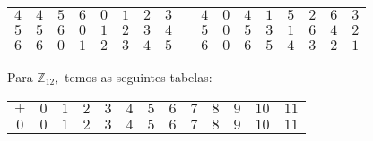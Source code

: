 \documentclass[12pt, a4paper]{article}
\begin{document}
\begin{solution}
\begin{center}
\begin{table}[h]
\begin{tabular}{ccccccccccccccccc}
\multicolumn{1}{c|}{$4$} & \multicolumn{1}{c|}{$4$} & \multicolumn{1}{c|}{$5$} & \multicolumn{1}{c|}{$6$} & \multicolumn{1}{c|}{$0$} & \multicolumn{1}{c|}{$1$} & \multicolumn{1}{c|}{$2$} & \multicolumn{1}{c|}{$3$} &  & \multicolumn{1}{c|}{$4$} & \multicolumn{1}{c|}{$0$} & \multicolumn{1}{c|}{$4$} & \multicolumn{1}{c|}{$1$} & \multicolumn{1}{c|}{$5$} & \multicolumn{1}{c|}{$2$} & \multicolumn{1}{c|}{$6$} & \multicolumn{1}{c|}{$3$} \\ \cline{2-8} \cline{11-17} 
\multicolumn{1}{c|}{$5$} & \multicolumn{1}{c|}{$5$} & \multicolumn{1}{c|}{$6$} & \multicolumn{1}{c|}{$0$} & \multicolumn{1}{c|}{$1$} & \multicolumn{1}{c|}{$2$} & \multicolumn{1}{c|}{$3$} & \multicolumn{1}{c|}{$4$} &  & \multicolumn{1}{c|}{$5$} & \multicolumn{1}{c|}{$0$} & \multicolumn{1}{c|}{$5$} & \multicolumn{1}{c|}{$3$} & \multicolumn{1}{c|}{$1$} & \multicolumn{1}{c|}{$6$} & \multicolumn{1}{c|}{$4$} & \multicolumn{1}{c|}{$2$} \\ \cline{2-8} \cline{11-17} 
\multicolumn{1}{c|}{$6$} & \multicolumn{1}{c|}{$6$} & \multicolumn{1}{c|}{$0$} & \multicolumn{1}{c|}{$1$} & \multicolumn{1}{c|}{$2$} & \multicolumn{1}{c|}{$3$} & \multicolumn{1}{c|}{$4$} & \multicolumn{1}{c|}{$5$} &  & \multicolumn{1}{c|}{$6$} & \multicolumn{1}{c|}{$0$} & \multicolumn{1}{c|}{$6$} & \multicolumn{1}{c|}{$5$} & \multicolumn{1}{c|}{$4$} & \multicolumn{1}{c|}{$3$} & \multicolumn{1}{c|}{$2$} & \multicolumn{1}{c|}{$1$} \\ \cline{2-8} \cline{11-17} 
\end{tabular}
\end{table}
\end{center}
Para $\mathbb{Z}_{12},$ temos as seguintes tabelas:
\begin{center}
    \begin{table}[h]
\begin{tabular}{ccccccccccccc}
\textbf{$+$}              & $0$                       & $1$                       & $2$                       & $3$                       & $4$                       & $5$                       & $6$                       & \multicolumn{1}{l}{$7$}   & \multicolumn{1}{l}{$8$}   & \multicolumn{1}{l}{$9$}   & \multicolumn{1}{l}{$10$}  & \multicolumn{1}{l}{$11$}  \\ \cline{2-13} 
\multicolumn{1}{c|}{$0$}  & \multicolumn{1}{c|}{$0$}  & \multicolumn{1}{c|}{$1$}  & \multicolumn{1}{c|}{$2$}  & \multicolumn{1}{c|}{$3$}  & \multicolumn{1}{c|}{$4$}  & \multicolumn{1}{c|}{$5$}  & \multicolumn{1}{c|}{$6$}  & \multicolumn{1}{c|}{$7$}  & \multicolumn{1}{c|}{$8$}  & \multicolumn{1}{c|}{$9$}  & \multicolumn{1}{c|}{$10$} & \multicolumn{1}{c|}{$11$} \\ \cline{2-13} 

\end{tabular}
\end{table}
\end{center}
\end{solution}
\end{document}
